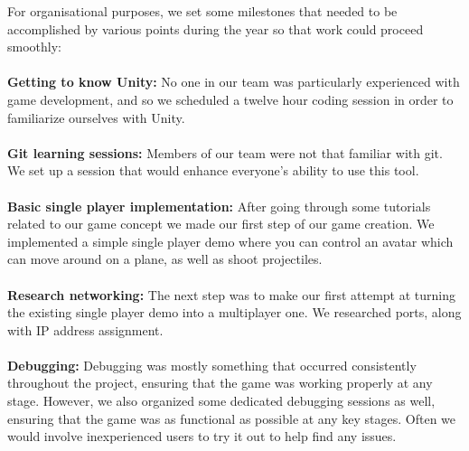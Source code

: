 \documentclass[11pt,a4paper]{article}
\begin{document}
        \noindent
        For organisational purposes, we set some milestones that needed to be accomplished by various points during the year so that work could proceed smoothly: \\ \\

\noindent
        \textbf{Getting to know Unity:} No one in our team was particularly experienced with game development, and so we scheduled a twelve hour coding session in order to familiarize ourselves with Unity.\\\\
\noindent
        \textbf{Git learning sessions:} Members of our team  were not that familiar with git. We set up a session that would enhance everyone’s ability to use this tool.\\\\
        \noindent
        \textbf{Basic single player implementation:} After going through some tutorials related to our game concept we made our first step of our game creation. We implemented a simple single player demo where you can control an avatar which can move around on a plane, as well as shoot projectiles. \\ \\
\noindent
        \textbf{Research networking:} The next step was to make our first attempt at turning the existing single player demo into a multiplayer one. We researched ports, along with IP address assignment. \\ \\
        \noindent
        \textbf{Debugging:} Debugging was mostly something that occurred consistently throughout the project, ensuring that the game was working properly at any stage. However, we also organized some dedicated debugging sessions as well, ensuring that the game was as functional as possible at any key stages. Often we would involve inexperienced users to try it out to help find any issues. \\ \\
\end{document}
